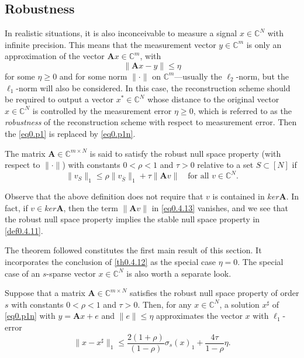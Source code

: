 \subsection{Robustness}

In realistic situations, it is also inconceivable to measure a signal $x \in \mathbb{C}^N$ with infinite precision. This means that the measurement vector $y \in \mathbb{C}^m$ is only an approximation of the vector $\mathbf{A}x \in \mathbb{C}^m$, with
\[
    \|\mathbf{A}x - y\| \leq \eta
\]
for some $\eta \geq 0$ and for some norm $\|\cdot\|$ on $\mathbb{C}^m$---usually the $\ell_2$-norm, but the $\ell_1$-norm will also be considered. In this case, the reconstruction scheme should be required to output a vector $x^* \in \mathbb{C}^N$ whose distance to the original vector $x \in \mathbb{C}^N$ is controlled by the measurement error $\eta \geq 0$, which is referred to as the \emph{\textcolor[rgb]{1,0,0}{robustness}} of the reconstruction scheme with respect to measurement error. Then the \cref{eq0.p1} is replaced by \cref{eq0.p1n}.

\begin{definition}
    \label{def0.4.17}
    The matrix $\mathbf{A} \in \mathbb{C}^{m \times N}$ is said to satisfy the \textcolor[rgb]{1,0,0}{robust null space property} (with respect to $\|\cdot\|$) with constants $0<\rho<1$ and $\tau>0$ relative to a set $S \subset [N]$ if 
    \begin{equation}
        \|v_S\|_1 \leq \rho \|v_{\overline{S}}\|_1 + \tau\|\mathbf{A}v\| \quad \text{for all } v \in \mathbb{C}^N.
        \label{eq0.4.13}
    \end{equation}
\end{definition}
\begin{remark}
    \label{rmk0.4.18}
    Observe that the above definition does not require that $v$ is contained in $ker\mathbf{A}$. In fact, if $v \in ker\mathbf{A}$, then the term $\|\mathbf{A}v\|$ in \cref{eq0.4.13} vanishes, and we see that the \textcolor[rgb]{1,0,0}{robust null space property implies the stable null space property in \cref{def0.4.11}}.
\end{remark}

The theorem followed constitutes the first main result of this section. It incorporates the conclusion of \cref{th0.4.12} as the special case $\eta = 0$. The special case of an $s$-sparse vector $x \in \mathbb{C}^N$ is also worth a separate look.

\begin{theorem}
    \label{th0.4.19}
    Suppose that a matrix $\mathbf{A} \in \mathbb{C}^{m\times N}$ satisfies the robust null space property of order $s$ with constants $0<\rho<1$ and $\tau>0$. Then, for any $x \in \mathbb{C}^N$, a solution $x^{\sharp}$ of \cref{eq0.p1n} with $y = \mathbf{A}x + e$ and $\|e\| \leq \eta$ approximates the vector $x$ with $\ell_1$-error
    \[
        \|x - x^{\sharp}\|_1 \leq \frac{2(1+\rho)}{(1-\rho)} \sigma_s(x)_1 + \frac{4 \tau}{1-\rho}\eta.
    \]
\end{theorem}

